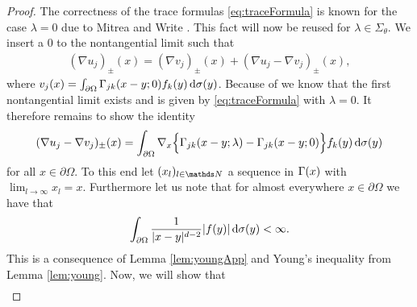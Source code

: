 \begin{proof}
  The correctness of the trace formulas \eqref{eq:traceFormula} is known for the case $\lambda = 0$ due to Mitrea and Write \cite[Prop 4.4]{mitreaWright}.
  This fact will now be reused for $\lambda \in \Sigma_\theta$.
  We insert a $0$ to the nontangential limit such that
  \begin{align*}
    (\nabla u_j)_\pm(x) = 
    (\nabla v_j)_\pm(x) + (\nabla u_j - \nabla v_j)_\pm(x),
  \end{align*}
  where $v_j(x) = \int_{\partial\Omega} \Gamma_{jk}(x - y; 0) f_k(y) \, {\operatorname{d}\!{\sigma}}(y)$.
  Because of \cite{mitreaWright} we know that the first nontangential limit exists and is given by \eqref{eq:traceFormula} with $\lambda = 0$.
  It therefore remains to show the identity
  \begin{align*}
    (\nabla u_j - \nabla v_j)_\pm(x) = \int_{\partial\Omega} \nabla_x \Big\{ \Gamma_{jk}(x - y; \lambda) - \Gamma_{jk}(x - y; 0) \Big\} f_k(y) \, {\operatorname{d}\!{\sigma}}(y)
  \end{align*}
  for all $x \in \partial \Omega$.
  To this end let $(x_l)_{l \in \N}$ a sequence in $\Gamma(x)$ with $\lim_{l \to \infty} x_l = x$.
  Furthermore let us note that for almost everywhere $x \in \partial\Omega$ we have that 
  \begin{align*}
    \int_{\partial\Omega} \frac{1}{|x - y|^{d - 2}} |f(y)| \, {\operatorname{d}\!{\sigma}}(y) < \infty.
  \end{align*}
  This is a consequence of Lemma \ref{lem:youngApp} and Young's inequality from Lemma \ref{lem:young}.
  Now, we will show that
  \begin{align*}

\end{align*}
\end{proof}
